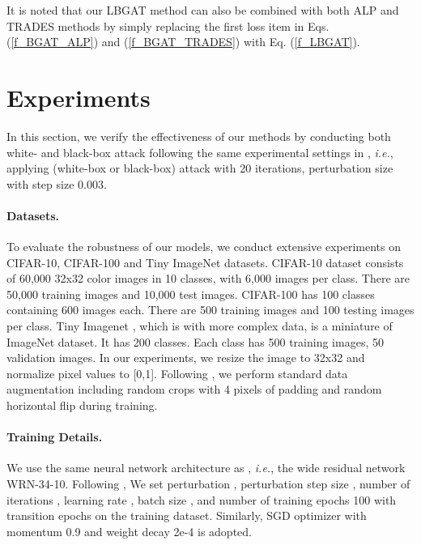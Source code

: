 \documentclass[final]{cvpr}
\begin{document}
It is noted that our LBGAT method can also be combined with both ALP and TRADES methods by simply replacing the first loss item in Eqs. (\ref{f_BGAT_ALP}) and (\ref{f_BGAT_TRADES}) with Eq. (\ref{f_LBGAT}).

\section{Experiments}
\label{exp_evaluation}
In this section, we verify the effectiveness of our methods by conducting both white- and black-box attack following the same experimental settings in \cite{zhang2019theoretically}, {\it i.e.}, applying  (white-box or black-box) attack with 20 iterations, perturbation size   with step size 0.003.

\paragraph{Datasets.}
To evaluate the robustness of our models, we conduct extensive experiments on CIFAR-10, CIFAR-100 and Tiny ImageNet datasets. CIFAR-10 dataset consists of 60,000 32x32 color images in 10 classes, with 6,000 images per class. There are 50,000 training images and 10,000 test images. 
CIFAR-100 has 100 classes containing 600 images each. There are 500 training images and 100 testing images per class. 
Tiny Imagenet \cite{DBLP:conf/cvpr/DengDSLL009}, which is with more complex data, is a miniature of ImageNet dataset. It has 200 classes. Each class has 500 training images, 50 validation images. In our experiments, we resize the image to 32x32 and normalize pixel values to [0,1].
Following \cite{zhang2019theoretically}, we perform standard data augmentation including random crops with 4 pixels of padding and random horizontal flip during training.

\paragraph{Training Details.}
We use the same neural network architecture as \cite{zhang2019theoretically}, {\it i.e.}, the wide residual network WRN-34-10. Following \cite{zhang2019theoretically}, We set perturbation , perturbation step size , number of iterations , learning rate , batch size , and number of training epochs 100 with transition epochs  on the training dataset. Similarly, SGD optimizer with momentum 0.9 and weight decay 2e-4 is adopted.
\end{document}
